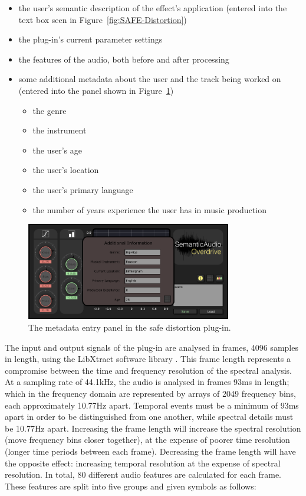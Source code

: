 		\begin{itemize}
			\item the user's semantic description of the effect's application (entered into the text box seen
				in Figure~\ref{fig:SAFE-Distortion})
			\item the plug-in's current parameter settings
			\item the features of the audio, both before and after processing
			\item some additional metadata about the user and the track being worked on (entered into the panel
				shown in Figure~\ref{fig:SAFE-Metadata})
			\begin{itemize}
				\item the genre
				\item the instrument
				\item the user's age
				\item the user's location
				\item the user's primary language
				\item the number of years experience the user has in music production
			\end{itemize}
		\end{itemize}

		\begin{figure}[h!]
			\centering
			\includegraphics[width=0.8\textwidth]{chapter4/Images/SAFEMetadata.png}
			\caption{The metadata entry panel in the \acrshort{safe} distortion plug-in.}
			\label{fig:SAFE-Metadata}
		\end{figure}

		The input and output signals of the plug-in are analysed in frames, 4096 samples in length, using the
		LibXtract software library \citep{bullock2007libxtract}. This frame length represents a compromise between
		the time and frequency resolution of the spectral analysis. At a sampling rate of 44.1kHz, the audio is
		analysed in frames 93ms in length; which in the frequency domain are represented by arrays of 2049
		frequency bins, each approximately 10.77Hz apart. Temporal events must be a minimum of 93ms apart in order
		to be distinguished from one another, while spectral details must be 10.77Hz apart. Increasing the frame
		length will increase the spectral resolution (move frequency bins closer together), at the expense of
		poorer time resolution (longer time periods between each frame).  Decreasing the frame length will have the
		opposite effect: increasing temporal resolution at the expense of spectral resolution. In total, 80
		different audio features are calculated for each frame. These features are split into five groups and given
		symbols as follows:

